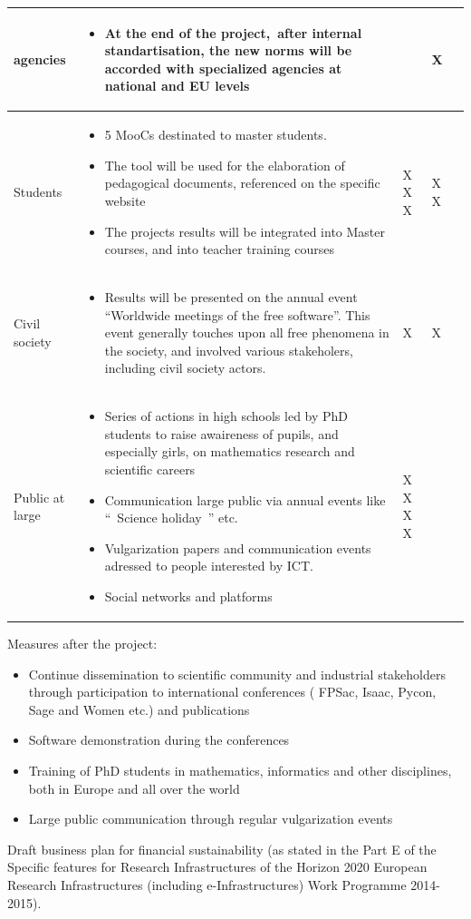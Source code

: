 \begin{flushleft}
\begin{supertabular}{|m{2.7949998cm}|m{10.711cm}|m{1.0489999cm}|m{1.301cm}|m{1.163cm}|}
agencies  &
\begin{itemize}
\item At the end of the project,~after internal standartisation, the new
norms will be accorded with specialized agencies at national and EU
levels\end{itemize}
 &
 &
X &
\\\hline
Students &
\begin{itemize}
\item 5 MooCs destinated to master students.\item The tool will be used
for the elaboration of pedagogical documents, referenced on the
specific website\item The projects results will be integrated into
Master courses, and into teacher training courses\end{itemize}
 &
X
X
X
 &
X
X &
\\\hline
Civil society &
\begin{itemize}
\item Results will be presented on the annual event “Worldwide meetings
of the free software”. This event generally touches upon all free
phenomena in the society, and involved various stakeholers, including
civil society actors.\end{itemize}
 &
X &
X &
\\\hline
Public at large &
\begin{itemize}
\item Series of actions in high schools led by PhD students to raise
awaireness of pupils, and especially girls, on mathematics research and
scientific careers\item Communication large public via annual events
like ``~Science holiday~'' etc.\item Vulgarization papers and
communication events adressed to people interested by ICT. \item Social
networks and platforms\end{itemize}
 &
X
X
X
X &
 &
\\\hline
\end{supertabular}
\end{flushleft}
Measures after the project:

\begin{itemize}
\item Continue dissemination to scientific community and industrial
stakeholders through participation to international conferences (
FPSac, Isaac, Pycon, Sage and Women etc.) and publications
\item Software demonstration during the conferences
\item Training of  PhD students in mathematics, informatics and other
disciplines, both in Europe and all over the world
\item Large public communication  through regular vulgarization events
\end{itemize}
Draft business plan for financial sustainability (as stated in the Part
E of the Specific features for Research Infrastructures of the Horizon
2020 European Research Infrastructures (including e-Infrastructures)
Work Programme 2014-2015).

